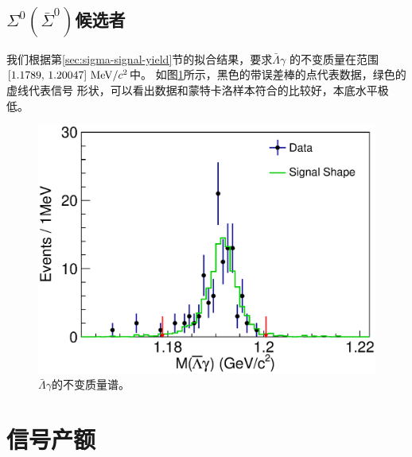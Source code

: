 \subsection{$\Sigma^{0} (\bar{\Sigma}^{0})$候选者}
我们根据第\ref{sec:sigma-signal-yield}节的拟合结果，要求$\bar{\Lambda} \gamma$
的不变质量在范围$[1.1789,\,1.20047]~{\rm MeV}/c^{2}$中。
如图\ref{fig:tagSigmaMass}所示，黑色的带误差棒的点代表数据，绿色的虚线代表信号
形状，可以看出数据和蒙特卡洛样本符合的比较好，本底水平极低。
\begin{figure}[htpb]
    \centering
    \includegraphics[width=0.8\linewidth]{figures/Sigma/eve/tagmS.eps}
    \caption{$\bar{\Lambda} \gamma$的不变质量谱。
    }%
    \label{fig:tagSigmaMass}
\end{figure}
\section{信号产额}


